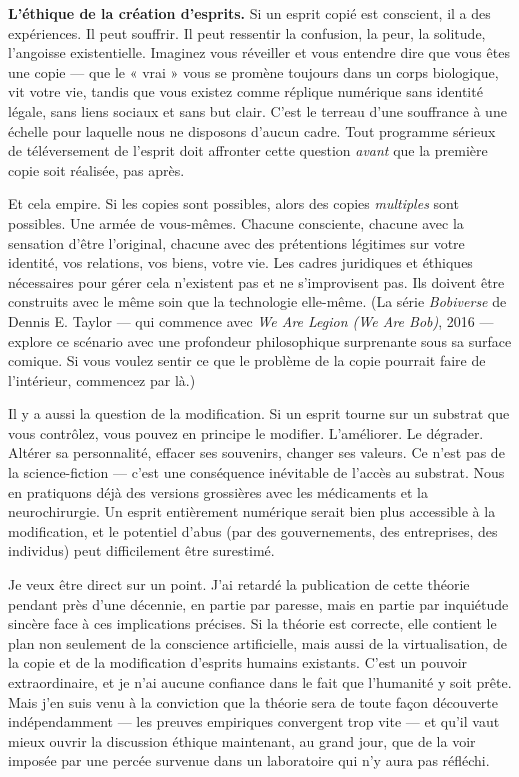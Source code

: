 \documentclass[11pt, twoside, openright]{book}
\begin{document}
\textbf{L'éthique de la création d'esprits.} Si un esprit copié est conscient, il a des expériences. Il peut souffrir. Il peut ressentir la confusion, la peur, la solitude, l'angoisse existentielle. Imaginez vous réveiller et vous entendre dire que vous êtes une copie --- que le « vrai » vous se promène toujours dans un corps biologique, vit votre vie, tandis que vous existez comme réplique numérique sans identité légale, sans liens sociaux et sans but clair. C'est le terreau d'une souffrance à une échelle pour laquelle nous ne disposons d'aucun cadre. Tout programme sérieux de téléversement de l'esprit doit affronter cette question \textit{avant} que la première copie soit réalisée, pas après.

Et cela empire. Si les copies sont possibles, alors des copies \textit{multiples} sont possibles. Une armée de vous-mêmes. Chacune consciente, chacune avec la sensation d'être l'original, chacune avec des prétentions légitimes sur votre identité, vos relations, vos biens, votre vie. Les cadres juridiques et éthiques nécessaires pour gérer cela n'existent pas et ne s'improvisent pas. Ils doivent être construits avec le même soin que la technologie elle-même. (La série \textit{Bobiverse} de Dennis E. Taylor --- qui commence avec \textit{We Are Legion (We Are Bob)}, 2016 --- explore ce scénario avec une profondeur philosophique surprenante sous sa surface comique. Si vous voulez sentir ce que le problème de la copie pourrait faire de l'intérieur, commencez par là.)

Il y a aussi la question de la modification. Si un esprit tourne sur un substrat que vous contrôlez, vous pouvez en principe le modifier. L'améliorer. Le dégrader. Altérer sa personnalité, effacer ses souvenirs, changer ses valeurs. Ce n'est pas de la science-fiction --- c'est une conséquence inévitable de l'accès au substrat. Nous en pratiquons déjà des versions grossières avec les médicaments et la neurochirurgie. Un esprit entièrement numérique serait bien plus accessible à la modification, et le potentiel d'abus (par des gouvernements, des entreprises, des individus) peut difficilement être surestimé.

Je veux être direct sur un point. J'ai retardé la publication de cette théorie pendant près d'une décennie, en partie par paresse, mais en partie par inquiétude sincère face à ces implications précises. Si la théorie est correcte, elle contient le plan non seulement de la conscience artificielle, mais aussi de la virtualisation, de la copie et de la modification d'esprits humains existants. C'est un pouvoir extraordinaire, et je n'ai aucune confiance dans le fait que l'humanité y soit prête. Mais j'en suis venu à la conviction que la théorie sera de toute façon découverte indépendamment --- les preuves empiriques convergent trop vite --- et qu'il vaut mieux ouvrir la discussion éthique maintenant, au grand jour, que de la voir imposée par une percée survenue dans un laboratoire qui n'y aura pas réfléchi.
\end{document}
